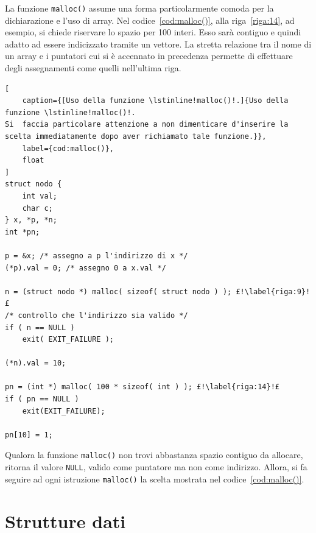 La funzione \lstinline!malloc()! assume una forma particolarmente comoda per la dichiarazione e l'uso di array.
Nel codice~\ref{cod:malloc()}, alla riga~\ref{riga:14}, ad esempio, si chiede riservare lo spazio per \num{100} interi.
Esso sarà contiguo e quindi adatto ad essere indicizzato tramite un vettore.
La stretta relazione tra il nome di un array e i puntatori cui si è accennato in precedenza permette di effettuare degli assegnamenti come quelli nell'ultima riga.
\begin{lstlisting}[
	caption={[Uso della funzione \lstinline!malloc()!.]{Uso della funzione \lstinline!malloc()!.
Si  faccia particolare attenzione a non dimenticare d'inserire la scelta immediatamente dopo aver richiamato tale funzione.}},
	label={cod:malloc()},
	float
]
struct nodo {
	int val;
	char c;
} x, *p, *n;
int *pn;

p = &x; /* assegno a p l'indirizzo di x */
(*p).val = 0; /* assegno 0 a x.val */

n = (struct nodo *) malloc( sizeof( struct nodo ) ); £!\label{riga:9}!£
/* controllo che l'indirizzo sia valido */
if ( n == NULL )
	exit( EXIT_FAILURE );

(*n).val = 10;

pn = (int *) malloc( 100 * sizeof( int ) ); £!\label{riga:14}!£
if ( pn == NULL )
	exit(EXIT_FAILURE);

pn[10] = 1;
\end{lstlisting}
Qualora la funzione \lstinline!malloc()! non trovi abbastanza spazio contiguo da allocare, ritorna il valore \lstinline!NULL!,  valido come puntatore ma non come indirizzo.
Allora, si fa seguire ad ogni istruzione \lstinline!malloc()! la scelta mostrata nel codice~\ref{cod:malloc()}.%

	\section{Strutture dati}
